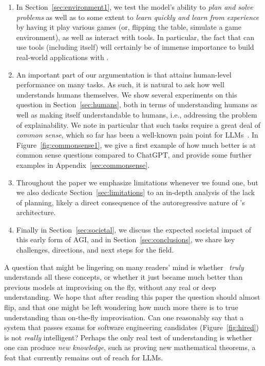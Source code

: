 \begin{enumerate}
\item In Section~\ref{sec:environment1}, we test the model's ability to {\em plan and solve problems} as well as to some extent to {\em learn quickly and learn from experience} by having it play various games (or, flipping the table, simulate a game environment), as well as interact with tools. In particular, the fact that {\DV} can use tools (including itself) will certainly be of immense importance to build real-world applications with {\DV}.
\item An important part of our argumentation is that {\DV} attains human-level performance on many tasks. As such, it is natural to ask how well {\DV} understands humans themselves. We show several experiments on this question in Section~\ref{sec:humans}, both in terms of understanding humans as well as {\DV} making itself understandable to humans, i.e., addressing the problem of explainability. We note in particular that such tasks require a great deal of {\em common sense}, which so far has been a well-known pain point for LLMs~\cite{davis2015commonsense}. In Figure~\ref{fig:commonsense1}, we give a first example of how much better {\DV} is at common sense questions compared to ChatGPT, and provide some further examples in Appendix~\ref{sec:commonsense}.
\item Throughout the paper we emphasize limitations whenever we found one, but we also dedicate Section~\ref{sec:limitations} to an in-depth analysis of the lack of planning, likely a direct consequence of the autoregressive nature of {\DV}'s architecture.
\item Finally in Section~\ref{sec:societal}, we discuss the expected societal impact of this early form of AGI, and in Section~\ref{sec:conclusions}, we share key challenges, directions, and next steps for the field.
\end{enumerate}

A question that might be lingering on many readers' mind is whether \DV\ {\em truly} understands all these concepts, or whether it just became much better than previous models at improvising on the fly, without any real or deep understanding. We hope that after reading this paper the question should almost flip, and that one might be left wondering how much more there is to true understanding than on-the-fly improvisation. Can one reasonably say that a system that passes exams for software engineering candidates (Figure~\ref{fig:hired}) is not {\em really} intelligent? Perhaps the only real test of understanding is whether one can produce {\em new knowledge}, such as proving new mathematical theorems, a feat that currently remains out of reach for LLMs.

